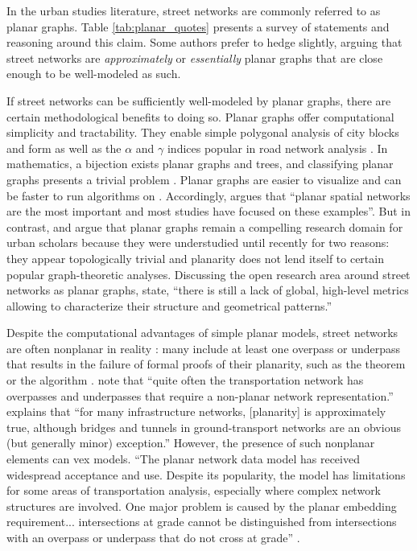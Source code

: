 \documentclass[Afour,sageh,times]{sagej}
\begin{document}
In the urban studies literature, street networks are commonly referred to as planar graphs. Table \ref{tab:planar_quotes} presents a survey of statements and reasoning around this claim. Some authors prefer to hedge slightly, arguing that street networks are \emph{approximately} or \emph{essentially} planar graphs that are close enough to be well-modeled as such.

If street networks can be sufficiently well-modeled by planar graphs, there are certain methodological benefits to doing so. Planar graphs offer computational simplicity and tractability. They enable simple polygonal analysis of city blocks and form \citep{fohl_non-planar_1996,barthelemy_paths_2017} as well as the $\alpha$ and $\gamma$ indices popular in road network analysis \citep{eppstein_studying_2008}. In mathematics, a bijection exists planar graphs and trees, and classifying planar graphs presents a trivial problem \citep{louf_typology_2014}. Planar graphs are easier to visualize and can be faster to run algorithms on \citep{liebers_planarizing_2001}. Accordingly, \citet[p.~3]{barthelemy_spatial_2011} argues that \enquote{planar spatial networks are the most important and most studies have focused on these examples}. But in contrast, \citet{masucci_random_2009} and \citet{masucci_limited_2013} argue that planar graphs remain a compelling research domain for urban scholars because they were understudied until recently for two reasons: they appear topologically trivial and planarity does not lend itself to certain popular graph-theoretic analyses. Discussing the open research area around street networks as planar graphs, \citet[p.~1]{viana_simplicity_2013} state, \enquote{there is still a lack of global, high-level metrics allowing to characterize their structure and geometrical patterns.}

Despite the computational advantages of simple planar models, street networks are often nonplanar in reality \citep[p.~7]{levinson_network_2012}: many include at least one overpass or underpass that results in the failure of formal proofs of their planarity, such as the \citet{kuratowski_sur_1930} theorem or the \cite{hopcroft_efficient_1974} algorithm \citep[cf.][]{gastner_spatial_2006}. \citet[p.~199]{jiang_object-oriented_2010} note that \enquote{quite often the transportation network has overpasses and underpasses that require a non-planar network representation.} \citet[p.~1258]{fischer_spatial_2014} explains that \enquote{for many infrastructure networks, {[planarity]} is approximately true, although bridges and tunnels in ground-transport networks are an obvious (but generally minor) exception.} However, the presence of such nonplanar elements can vex models. \enquote{The planar network data model has received widespread acceptance and use. Despite its popularity, the model has limitations for some areas of transportation analysis, especially where complex network structures are involved. One major problem is caused by the planar embedding requirement... intersections at grade cannot be distinguished from intersections with an overpass or underpass that do not cross at grade} \citep[p.~395]{fischer_gis_2004}.
\end{document}
